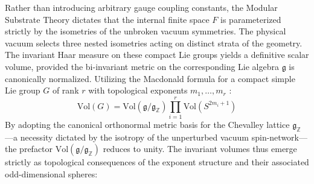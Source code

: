 \documentclass[12pt,a4paper]{article}
\begin{document}
Rather than introducing arbitrary gauge coupling constants, the Modular Substrate Theory dictates that the internal finite space $F$ is parameterized strictly by the isometries of the unbroken vacuum symmetries. The physical vacuum selects three nested isometries acting on distinct strata of the geometry. The invariant Haar measure on these compact Lie groups yields a definitive scalar volume, provided the bi-invariant metric on the corresponding Lie algebra $\mathfrak{g}$ is canonically normalized. Utilizing the Macdonald formula for a compact simple Lie group $G$ of rank $r$ with topological exponents $m_1, \dots, m_r$ \cite{macdonald1980}:
\begin{equation}
\text{Vol}(G) = \text{Vol}(\mathfrak{g}/\mathfrak{g}_{\mathbb{Z}}) \prod_{i=1}^{r} \text{Vol}(S^{2m_i+1})
\end{equation}
By adopting the canonical orthonormal metric basis for the Chevalley lattice $\mathfrak{g}_{\mathbb{Z}}$—a necessity dictated by the isotropy of the unperturbed vacuum spin-network—the prefactor $\text{Vol}(\mathfrak{g}/\mathfrak{g}_{\mathbb{Z}})$ reduces to unity. The invariant volumes thus emerge strictly as topological consequences of the exponent structure and their associated odd-dimensional spheres:
\end{document}
